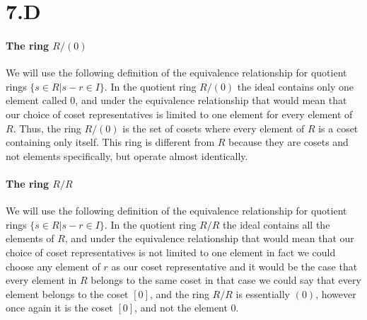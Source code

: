\documentclass{article}
\begin{document}
  \section*{7.D}
      \paragraph{The ring $R/(0)$} We will use the following definition of the equivalence relationship for quotient rings $\{s \in R | s - r \in I\}$. In the quotient ring $R/(0)$ the ideal contains only one element called 0, and under the equivalence relationship that would mean that our choice of coset representatives is limited to one element for every element of $R$. Thus, the ring $R/(0)$ is the set of cosets where every element of $R$ is a coset containing only itself. This ring is different from $R$ because they are cosets and not elements specifically, but operate almost identically.

      \paragraph{The ring $R/R$} We will use the following definition of the equivalence relationship for quotient rings $\{s \in R | s - r \in I\}$. In the quotient ring $R/R$ the ideal contains all the elements of $R$, and under the equivalence relationship that would mean that our choice of coset representatives is not limited to one element in fact we could choose any element of $r$ as our coset representative and it would be the case that every element in $R$ belongs to the same coset in that case we could say that every element belongs to the coset $[0]$, and the ring $R/R$ is essentially $(0)$, however once again it is the coset $[0]$, and not the element 0.
\end{document}
